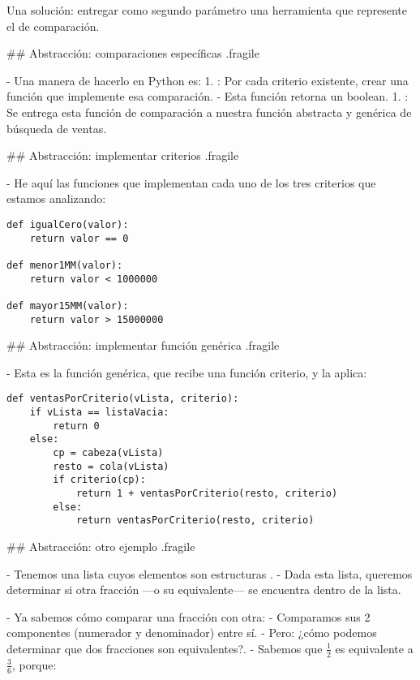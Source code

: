 \pause

\bgnblockidea
Una solución: entregar como segundo parámetro una herramienta que represente el 
de comparación.
\trmblockidea

## Abstracción: comparaciones específicas {.fragile}

- Una manera de hacerlo en Python es:
    1. : Por cada criterio existente, crear una función que implemente esa comparación.
        - Esta función retorna un boolean.
    1. : Se entrega esta función de comparación a nuestra función abstracta y genérica de búsqueda de ventas.

## Abstracción: implementar criterios {.fragile}

- He aquí las funciones que implementan cada uno de los tres criterios que estamos
analizando:

\begin{lstlisting}[style=frame02]
def igualCero(valor):
    return valor == 0

def menor1MM(valor):
    return valor < 1000000

def mayor15MM(valor):
    return valor > 15000000
\end{lstlisting}

## Abstracción: implementar función genérica {.fragile}

- Esta es la función genérica, que recibe una función criterio, y la aplica:

\begin{lstlisting}[style=frame02]
def ventasPorCriterio(vLista, criterio):
    if vLista == listaVacia:
        return 0
    else:
        cp = cabeza(vLista)
        resto = cola(vLista)
        if criterio(cp):
            return 1 + ventasPorCriterio(resto, criterio)
        else:
            return ventasPorCriterio(resto, criterio)
\end{lstlisting}

## Abstracción: otro ejemplo {.fragile}

- Tenemos una lista cuyos elementos son estructuras .
- Dada esta lista, queremos determinar si otra fracción ---o su equivalente--- se encuentra
dentro de la lista.

\pause


- Ya sabemos cómo comparar una fracción con otra:
    - Comparamos sus 2 componentes (numerador y denominador) entre sí.
- Pero: ¿cómo podemos determinar que dos fracciones son equivalentes?.
    - Sabemos que $\frac{1}{2}$ es equivalente a $\frac{3}{6}$, porque:

